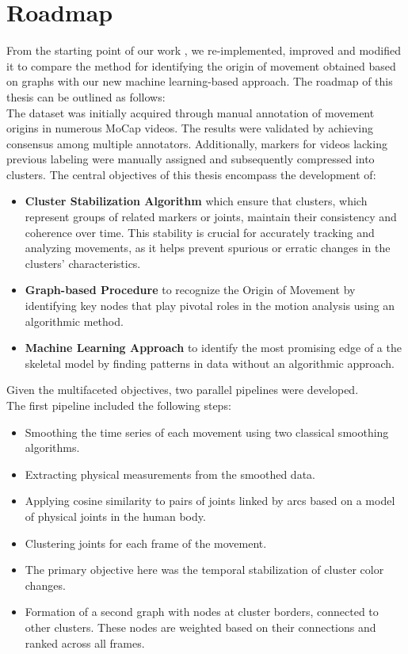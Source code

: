 \section{Roadmap}
From the starting point of our work \cite{kolykhalova:2020}, we re-implemented, improved and modified it to compare the method for identifying the origin of movement obtained based on graphs with our new machine learning-based approach.
The roadmap of this thesis can be outlined as follows: \\
The dataset was initially acquired through manual annotation of movement origins in numerous MoCap videos. 
The results were validated by achieving consensus among multiple annotators. 
Additionally, markers for videos lacking previous labeling were manually assigned and subsequently compressed into clusters.
The central objectives of this thesis encompass the development of:
\begin{itemize}
    \item \textbf{Cluster Stabilization Algorithm} which ensure that clusters, which represent groups of related markers or joints, maintain their consistency and coherence over time. 
    This stability is crucial for accurately tracking and analyzing movements, as it helps prevent spurious or erratic changes in the clusters' characteristics.
    \item \textbf{Graph-based Procedure} to recognize the Origin of Movement by identifying key nodes that play pivotal roles in the motion analysis using an algorithmic method.
    \item \textbf{Machine Learning Approach} to identify the most promising edge of a the skeletal model by finding patterns in data without an algorithmic approach.
\end{itemize}
Given the multifaceted objectives, two parallel pipelines were developed.\\
The first pipeline included the following steps:
\begin{itemize}
    \item Smoothing the time series of each movement using two classical smoothing algorithms.
    \item Extracting physical measurements from the smoothed data.
    \item Applying cosine similarity to pairs of joints linked by arcs based on a model of physical joints in the human body.
    \item Clustering joints for each frame of the movement.
    \item The primary objective here was the temporal stabilization of cluster color changes.
    \item Formation of a second graph with nodes at cluster borders, connected to other clusters. These nodes are weighted based on their connections and ranked across all frames.
\end{itemize}
